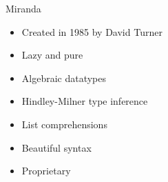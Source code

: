 \documentclass[pdf]{beamer}
\begin{document}
\begin{frame}{Miranda}
  \begin{figure}[H]
    \centering
    \hspace{0.3cm}
  \end{figure}
  \begin{itemize}
  \item Created in 1985 by David Turner
  \item Lazy and pure
  \item Algebraic datatypes
  \item Hindley-Milner type inference
  \item List comprehensions
  \item Beautiful syntax
  \item Proprietary
  \end{itemize}
\end{frame}
\end{document}
